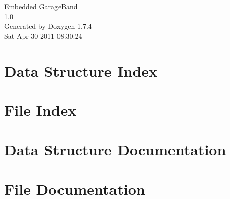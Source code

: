 \documentclass[a4paper]{book}
\begin{document}
\hypersetup{pageanchor=false}
\begin{titlepage}
\vspace*{7cm}
\begin{center}
{\Large Embedded GarageBand \\[1ex]\large 1.0 }\\
\vspace*{1cm}
{\large Generated by Doxygen 1.7.4}\\
\vspace*{0.5cm}
{\small Sat Apr 30 2011 08:30:24}\\
\end{center}
\end{titlepage}
\clearemptydoublepage
{}
\tableofcontents
\clearemptydoublepage
{}
\hypersetup{pageanchor=true}
\chapter{Data Structure Index}

\chapter{File Index}

\chapter{Data Structure Documentation}










\chapter{File Documentation}





























































\printindex
\end{document}
